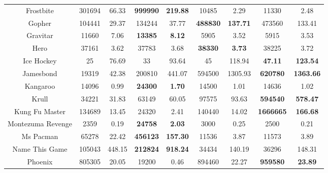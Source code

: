 \documentclass[nohyperref]{article}
\newcommand{\best}[1]{\textbf{#1}}
\theoremstyle{plain}
\begin{document}
\begin{table}[!hb]
\begin{center}
\begin{tabular}{| c | c c |c c |c c |c c |}
 Frostbite       &301694       &66.33            &\textbf{999990}       &\textbf{219.88}                & 10485             &2.29         &11330            &2.48   \\
 Gopher          &104441       &29.37            &134244                &37.77                          & \best{488830}     &\best{137.71} &473560           &133.41       \\
 Gravitar        &11660        &7.06           &\textbf{13385}        &\textbf{8.12}                  & 5905              &3.52           &5915             &3.53  \\
 Hero            &37161        &3.62                     &37783                  &3.68                           & \best{38330}      &\best{3.73}   &38225           &3.72           \\
 Ice Hockey      &25           &76.69          &33                     &93.64                          & 45         &118.94           &\textbf{47.11}  &\textbf{123.54} \\
 Jamesbond       &19319        &42.38            &200810                &441.07                         &594500              &1305.93         &\textbf{620780}       &\textbf{ 1363.66}\\
 Kangaroo        &14096        &0.99                   &\textbf{24300}        &\textbf{1.70}                  & 14500             &1.01             &14636           &1.02\\
 Krull           &34221        &31.83                     &63149                 &60.05                          & 97575      &93.63  &\textbf{594540}          &\textbf{578.47}        \\
 Kung Fu Master  &134689       &13.45      &24320                 &2.41                           & 140440     &14.02                 &\textbf{1666665}          &\textbf{166.68}\\
 Montezuma Revenge  &2359      &0.19             &\textbf{24758}        &\textbf{2.03}                  & 3000              &0.25                   &2500            &0.21\\
 Ms Pacman          &65278     &22.42     &\textbf{456123}       &\textbf{157.30}                & 11536             &3.87                          &11573           &3.89\\
 Name This Game     &105043    &448.15     &\textbf{212824}       &\textbf{918.24}               & 34434             &140.19                        &36296           &148.31\\
 Phoenix        &805305        &20.05                                &19200                 &0.46                           & 894460     &22.27 &\textbf{959580}          &\textbf{23.89}   \\

\end{tabular}
\end{center}
\end{table}
\end{document}
